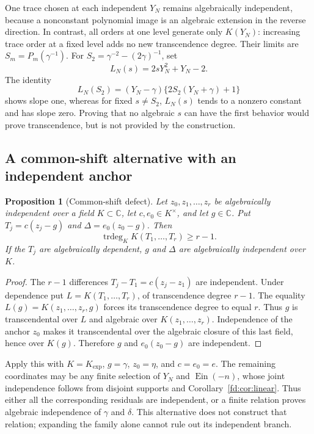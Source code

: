 \documentclass[11pt,a4paper]{article}
\newcommand{\C}{\mathbb C}
\newcommand{\Ein}{\operatorname{Ein}}
\newtheorem{proposition}[theorem]{Proposition}
\theoremstyle{definition}
\theoremstyle{remark}
\numberwithin{equation}{section}
\begin{document}
One trace chosen at each independent $Y_N$ remains algebraically
independent, because a nonconstant polynomial image is an algebraic
extension in the reverse direction.  In contrast, all orders at one level
generate only $K(Y_N)$: increasing trace order at a fixed level adds no
new transcendence degree.  Their limits are $S_m=P_m(\gamma^{-1})$.
For $S_2=\gamma^{-2}-(2\gamma)^{-1}$, set
\[
 L_N(s)=2sY_N^2+Y_N-2.
\]
The identity
\[
 L_N(S_2)=(Y_N-\gamma)\{2S_2(Y_N+\gamma)+1\}
\]
shows slope one, whereas for fixed $s\ne S_2$, $L_N(s)$ tends to a
nonzero constant and has slope zero.  Proving that no algebraic $s$
can have the first behavior would prove transcendence, but is not
provided by the construction.

\subsection{A common-shift alternative with an independent anchor}
\begin{proposition}[Common-shift defect]\label{fd:prop:shift}
Let $z_0,z_1,\ldots,z_r$ be algebraically independent over a field
$K\subset\C$, let $c,e_0\in K^\times$, and let $g\in\C$.  Put
$T_j=c(z_j-g)$ and $\Delta=e_0(z_0-g)$.  Then
\[
 \operatorname{trdeg}_K K(T_1,\ldots,T_r)\ge r-1.
\]
If the $T_j$ are algebraically dependent, $g$ and $\Delta$ are
algebraically independent over $K$.
\end{proposition}
\begin{proof}
The $r-1$ differences $T_j-T_1=c(z_j-z_1)$ are independent.  Under
dependence put $L=K(T_1,\ldots,T_r)$, of transcendence degree $r-1$.
The equality
$L(g)=K(z_1,\ldots,z_r,g)$ forces its transcendence degree to equal $r$.
Thus $g$ is transcendental over $L$ and algebraic over
$K(z_1,\ldots,z_r)$.  Independence of the anchor $z_0$ makes it
transcendental over the algebraic closure of this last field, hence over
$K(g)$.  Therefore $g$ and $e_0(z_0-g)$ are independent.
\end{proof}

Apply this with $K=K_{\exp}$, $g=\gamma$, $z_0=\eta$, and $c=e_0=e$.
The remaining coordinates may be any finite selection of $Y_N$ and
$\Ein(-n)$, whose joint independence follows from disjoint supports and
Corollary~\ref{fd:cor:linear}.  Thus either all the corresponding residuals
are independent, or a finite relation proves algebraic independence of
$\gamma$ and $\delta$.  This alternative does not construct that relation;
expanding the family alone cannot rule out its independent branch.
\end{document}
